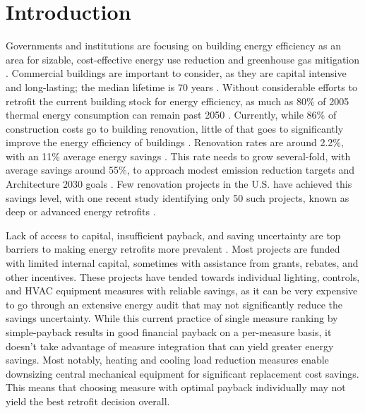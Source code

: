 \documentclass[review]{elsarticle}
\begin{document}
\section{Introduction}
Governments and institutions are focusing on building energy efficiency as an area for sizable, cost-effective energy use reduction and greenhouse gas mitigation \cite{McKinsey2009, Farese2012}.  Commercial buildings are important to consider, as they are capital intensive and long-lasting; the median lifetime is 70 years \cite{BEDB3.2.7}. Without considerable efforts to retrofit the current building stock for energy efficiency, as much as 80\% of 2005 thermal energy consumption can remain past 2050 \cite{Urge-Vorsatz2013141}. Currently, while 86\% of construction costs go to building renovation, little of that goes to significantly improve the energy efficiency of buildings \cite{Wang2012}. Renovation rates are around 2.2\%, with an 11\% average energy savings \cite{Olgyay2010244}. This rate needs to grow several-fold, with average savings around 55\%, to approach modest emission reduction targets and Architecture 2030 goals  \cite{Olgyay2010244}. Few renovation projects in the U.S. have achieved this savings level, with one recent study identifying only 50 such projects, known as deep or advanced energy retrofits \cite{NBI2011, AERG2011}.\par  
Lack of access to capital, insufficient payback, and saving uncertainty are top barriers to making energy retrofits more prevalent \cite{EEI2014, Abadie2012551}.  Most projects are funded with limited internal capital, sometimes with assistance from grants, rebates, and other incentives.  These projects have tended towards individual lighting, controls, and HVAC equipment measures with reliable savings, as it can be very expensive to go through an extensive energy audit that may not significantly reduce the savings uncertainty. While this current practice of single measure ranking by simple-payback results in good financial payback on a per-measure basis, it doesn't take advantage of measure integration that can yield greater energy savings. Most notably, heating and cooling load reduction measures enable downsizing central mechanical equipment for significant replacement cost savings.  This means that choosing measure with optimal payback individually may not yield the best retrofit decision overall.\par
\end{document}
